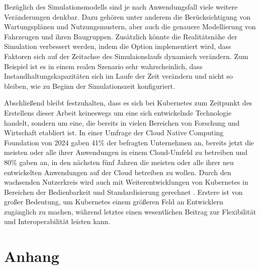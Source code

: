 \documentclass[11pt,a4paper]{article}
\begin{document}
Bezüglich des Simulationsmodells sind je nach Anwendungsfall viele weitere Veränderungen denkbar.
Dazu gehören unter anderem die Berücksichtigung von Wartungsplänen und Nutzungsmustern, aber auch
die genauere Modellierung von Fahrzeugen und ihren Baugruppen. 
Zusätzlich könnte die Realitätsnähe der Simulation verbessert werden, indem die Option
implementiert wird, dass Faktoren sich auf der Zeitachse des Simulaionslaufs dynamisch verändern.
Zum Beispiel ist es in einem realen Szenario sehr wahrscheinlich, dass Instandhaltungskapazitäten
sich im Laufe der Zeit verändern und nicht so bleiben, wie zu Beginn der Simulationszeit konfiguriert.

Abschließend bleibt festzuhalten, dass es sich bei Kubernetes zum Zeitpunkt des Erstellens dieser
Arbeit keineswegs um eine sich entwickelnde Technologie handelt, sondern um eine, die bereits
in vielen Bereichen von Forschung und Wirtschaft etabliert ist. In einer Umfrage der 
Cloud Native Computing Foundation von 2024 \cite{cncf} gaben 41\% der befragten Unternehmen an,
bereits jetzt die meisten oder alle ihrer Anwendungen in einem Cloud-Umfeld zu betreiben und
80\% gaben an, in den nächsten fünf Jahren die meisten oder alle ihrer neu entwickelten Anwendungen
auf der Cloud betreiben zu wollen. Durch den wachsenden Nutzerkreis wird auch mit Weiterentwicklungen
von Kubernetes in Bereichen der Bedienbarkeit und Standardisierung gerechnet \cite{emerging_trends}.
Erstere ist von großer Bedeutung, um Kubernetes einem größeren Feld an Entwicklern zugänglich
zu machen, während letztes einen wesentlichen Beitrag zur Flexibilität und Interoperabilität
leisten kann.

\section{Anhang}


% 
% 

\printbibliography
\end{document}
